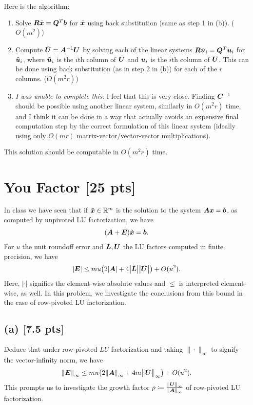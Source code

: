 \documentclass[twoside,10pt]{article}
\begin{document}
\quad Here is the algorithm:
\begin{enumerate}
  \item Solve $\bm{R}\tilde{\bm{x}} = \bm{Q}^T\bm{b}$ for $\tilde{\bm{x}}$ using back substitution (same as step 1 in (b)). ($O(m^2)$)
  \item Compute $\tilde{\bm{U}} = \bm{A}^{-1}\bm{U}$ by solving each of the linear systems $\bm{R}\tilde{\bm{u}}_i = \bm{Q}^T\bm{u}_i$ for $\tilde{\bm{u}}_i$, where $\tilde{\bm{u}}_i$ is the $i$th column of $\tilde{\bm{U}}$ and $\bm{u}_i$ is the $i$th column of $\bm{U}$.
  This can be done using back substitution (as in step 2 in (b)) for each of the $r$ columns. ($O(m^2r)$)
  \item \textit{I was unable to complete this.} I feel that this is very close. Finding $\bm{C}^{-1}$ should be possible using another linear system, similarly in $O(m^2r)$ time, and I think it can be done in a way that actually avoids an expensive final computation step by the correct formulation of this linear system (ideally using only $O(mr)$ matrix-vector/vector-vector multiplications).
\end{enumerate}

This solution should be computable in $O(m^2r)$ time.

\section{You Factor [25 pts]}
In class we have seen that if $\tilde{\bm{x}} \in \mathbb{R}^{m}$ is the solution to the system $\bm{A}\bm{x} = \bm{b}$, as computed by unpivoted LU factorization, we have  
\begin{equation}
  \left(\mtx{A} + \mtx{E}\right)\tilde{\vct{x}} = \vct{b}.  
\end{equation}
For $u$ the unit roundoff error and $\tilde{\bm{L}}, \tilde{\bm{U}}$ the LU factors computed in finite precision, we have
\begin{equation}
  \left|\mtx{E}\right| \leq m u \left(2 \left|\mtx{A}\right| + 4 \left|\tilde{\mtx{L}} \right| \left|\tilde{\mtx{U}}\right|\right) + O(u^2).
\end{equation}
Here, $|\cdot|$ signifies the element-wise absolute values and $\leq$ is interpreted element-wise, as well.
In this problem, we investigate the conclusions from this bound in the case of row-pivoted LU factorization.

\subsection*{(a) [7.5 pts]}
Deduce that under row-pivoted $LU$ factorization and taking $\| \cdot \|_{\infty}$ to signify the vector-infinity norm, we have 
\begin{equation}
  \left\|\mtx{E}\right\|_{\infty} \leq m u \left(2 \left\|\mtx{A}\right\|_{\infty} + 4 m \left\|\tilde{\mtx{U}}\right\|_{\infty} \right) + O(u^2).
\end{equation}
This prompts us to investigate the growth factor $\rho \coloneqq \frac{\left\| \mtx{U} \right\|_{\infty}}{\left\|\mtx{A}\right\|_{\infty}}$ of row-pivoted LU factorization.
\end{document}
